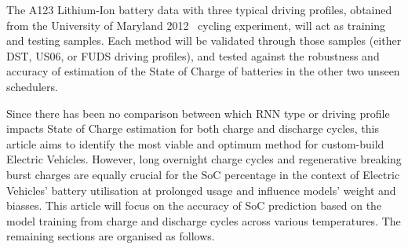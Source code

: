 The A123 Lithium-Ion battery data with three typical driving profiles, obtained from the University of Maryland 2012~\cite{noauthor_calce_2017} cycling experiment, will act as training and testing samples.
Each method will be validated through those samples (either DST, US06, or FUDS driving profiles), and tested against the robustness and accuracy of estimation of the State of Charge of batteries in the other two unseen schedulers.

%
%
 {
    Since there has been no comparison between which RNN type or driving profile impacts State of Charge estimation for both charge and discharge cycles, this article aims to identify the most viable and optimum method for custom-build Electric Vehicles.
}
However, long overnight charge cycles and regenerative breaking burst charges are equally crucial for the SoC percentage in the context of Electric Vehicles' battery utilisation at prolonged usage and influence models' weight and biasses.
This article will focus on the accuracy of SoC prediction based on the model training from charge and discharge cycles across various temperatures.
%
%
The remaining sections are organised as follows.
